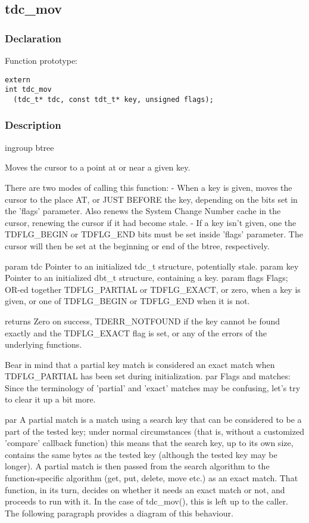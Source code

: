 
\newpage
\subsection{tdc\_mov}
\subsubsection{Declaration} Function prototype:

\begin{verbatim}
extern
int tdc_mov
  (tdc_t* tdc, const tdt_t* key, unsigned flags);
\end{verbatim}

\subsubsection{Description}


 ingroup btree

 Moves the cursor to a point at or near a given key.

 There are two modes of calling this function:
 - When a key is given, moves the cursor to the place AT, or JUST BEFORE the
   key, depending on the bits set in the 'flags' parameter.  Also renews the
   System Change Number cache in the cursor, renewing the cursor if it had
   become stale.
 - If a key isn't given, one the TDFLG\_BEGIN or TDFLG\_END bits must be
   set inside 'flags' parameter.  The cursor will then be set at the
   beginning or end of the btree, respectively.

 param tdc Pointer to an initialized tdc\_t structure, potentially stale.
 param key Pointer to an initialized dbt\_t structure, containing a key.
 param flags Flags; OR-ed together TDFLG\_PARTIAL or TDFLG\_EXACT, or zero,
 when a key is given, or one of TDFLG\_BEGIN or TDFLG\_END when it is not.

 returns Zero on success, TDERR\_NOTFOUND if the key cannot be found exactly
 and the TDFLG\_EXACT flag is set, or any of the errors of the underlying
 functions.

 Bear in mind that a partial key match is considered an
 exact match when TDFLG\_PARTIAL has been set during initialization.
 par Flags and matches:
 Since the terminology of 'partial' and 'exact' matches may be confusing,
 let's try to clear it up a bit more.

 par
 A partial match is a match using a search key that can be considered
 to be a part of the tested key; under normal circumstances
 (that is, without a customized 'compare' callback function) this means
 that the search key, up to its own size, contains the same bytes as the
 tested key (although the tested key may be longer).  A partial match is
 then passed from the search algorithm to the function-specific algorithm
 (get, put, delete, move etc.) as an exact match.  That function, in its
 turn, decides on whether it needs an exact match or not, and proceeds to
 run with it.  In the case of tdc\_mov(), this is left up to the caller.
 The following paragraph provides a diagram of this behaviour.

